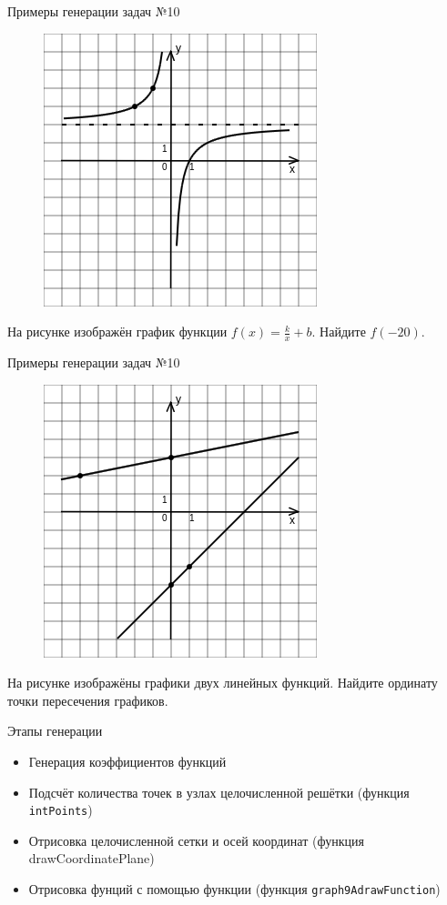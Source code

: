 \documentclass[aspectratio=169]{beamer}
\begin{document}
\begin{frame}{Примеры генерации задач №10}
    \vspace{-0.5cm}
    \begin{figure}[t]
    \includegraphics[scale=0.45]{images/610459930097164n0}
    \end{figure}
    На рисунке изображён график функции $f(x)=\frac{k}{x}+b$. Найдите $f(-20)$.
\end{frame}

\begin{frame}{Примеры генерации задач №10}
    \vspace{-0.5cm}
    \begin{figure}[t]
    \includegraphics[scale=0.45]{images/1971545344438219n0}
    \end{figure}
    На рисунке изображёны графики двух линейных функций. Найдите ординату точки пересечения графиков.

\end{frame}

\begin{frame}{Этапы генерации}
    \begin{itemize}
        \item Генерация коэффициентов функций
        \item Подсчёт количества точек в узлах целочисленной решётки (функция \texttt{intPoints})
        \item Отрисовка целочисленной сетки и осей координат (функция drawCoordinatePlane)
        \item Отрисовка фунций с помощью функции (функция \texttt{graph9AdrawFunction})
    \end{itemize}
    
\end{frame}
\end{document}
